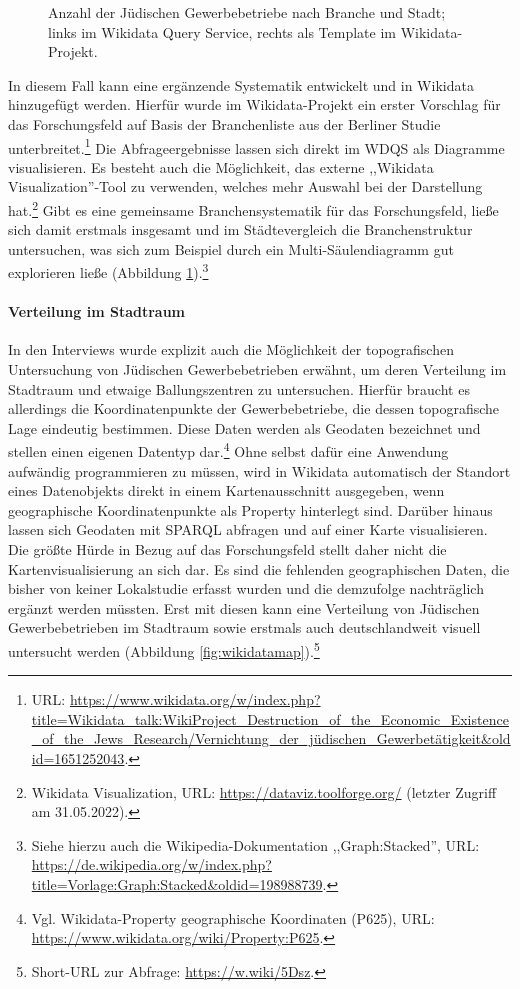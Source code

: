 \begin{figure}[h]
    \centering
    \caption[Anzahl der Jüdischen Gewerbebetriebe nach Branche und Stadt]{Anzahl der Jüdischen Gewerbebetriebe nach Branche und Stadt; links im Wikidata Query Service, rechts als Template im Wikidata-Projekt.}
    \label{fig:wikidatacharts}
\end{figure}

In diesem Fall kann eine ergänzende Systematik entwickelt und in Wikidata hinzugefügt werden. Hierfür wurde im Wikidata-Projekt ein erster Vorschlag für das Forschungsfeld auf Basis der Branchenliste aus der Berliner Studie unterbreitet.\footnote{URL: \url{https://www.wikidata.org/w/index.php?title=Wikidata_talk:WikiProject\_Destruction\_of\_the\_Economic\_Existence\_of\_the\_Jews\_Research/Vernichtung\_der\_jüdischen_Gewerbetätigkeit\&oldid=1651252043}.} Die Abfrageergebnisse lassen sich direkt im WDQS als Diagramme visualisieren. Es besteht auch die Möglichkeit, das externe ,,Wikidata Visualization''-Tool zu verwenden, welches mehr Auswahl bei der Darstellung hat.\footnote{Wikidata Visualization, URL: \url{https://dataviz.toolforge.org/} (letzter Zugriff am 31.05.2022).} Gibt es eine gemeinsame Branchensystematik für das Forschungsfeld, ließe sich damit erstmals insgesamt und im Städtevergleich die Branchenstruktur untersuchen, was sich zum Beispiel durch ein Multi-Säulendiagramm gut explorieren ließe (Abbildung \ref{fig:wikidatacharts}).\footnote{Siehe hierzu auch die Wikipedia-Dokumentation ,,Graph:Stacked'', URL: \url{https://de.wikipedia.org/w/index.php?title=Vorlage:Graph:Stacked\&oldid=198988739}.}

\paragraph{Verteilung im Stadtraum}

In den Interviews wurde explizit auch die Möglichkeit der topografischen Untersuchung von Jüdischen Gewerbebetrieben erwähnt, um deren Verteilung im Stadtraum und etwaige Ballungszentren zu untersuchen. Hierfür braucht es allerdings die Koordinatenpunkte der Gewerbebetriebe, die dessen topografische Lage eindeutig bestimmen. Diese Daten werden als Geodaten bezeichnet und stellen einen eigenen Datentyp dar.\footnote{Vgl. Wikidata-Property geographische Koordinaten (P625), URL: \url{https://www.wikidata.org/wiki/Property:P625}.} Ohne selbst dafür eine Anwendung aufwändig programmieren zu müssen, wird in Wikidata automatisch der Standort eines Datenobjekts direkt in einem Kartenausschnitt ausgegeben, wenn geographische Koordinatenpunkte als Property hinterlegt sind. Darüber hinaus lassen sich Geodaten mit SPARQL abfragen und auf einer Karte visualisieren. Die größte Hürde in Bezug auf das Forschungsfeld stellt daher nicht die Kartenvisualisierung an sich dar. Es sind die fehlenden geographischen Daten, die bisher von keiner Lokalstudie erfasst wurden und die demzufolge nachträglich ergänzt werden müssten. Erst mit diesen kann eine Verteilung von Jüdischen Gewerbebetrieben im Stadtraum sowie erstmals auch deutschlandweit visuell untersucht werden (Abbildung \ref{fig:wikidatamap}).\footnote{Short-URL zur Abfrage: \url{https://w.wiki/5Dsz}.}

